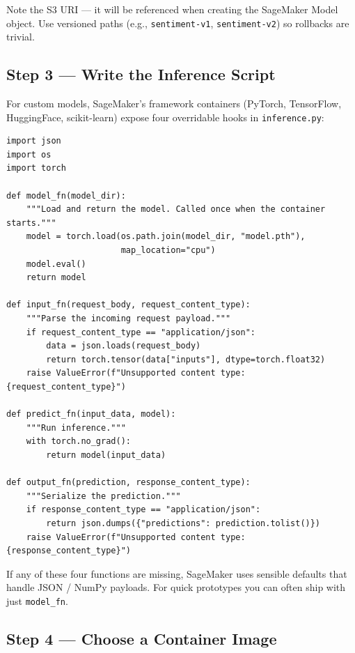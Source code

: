 \documentclass[11pt,a4paper]{article}
\begin{document}
Note the S3 URI --- it will be referenced when creating the SageMaker Model
object. Use versioned paths (e.g., \texttt{sentiment-v1}, \texttt{sentiment-v2})
so rollbacks are trivial.

\subsection{Step 3 --- Write the Inference Script}

For custom models, SageMaker's framework containers (PyTorch, TensorFlow,
HuggingFace, scikit-learn) expose four overridable hooks in \texttt{inference.py}:

\begin{lstlisting}[style=pycode]
import json
import os
import torch

def model_fn(model_dir):
    """Load and return the model. Called once when the container starts."""
    model = torch.load(os.path.join(model_dir, "model.pth"),
                       map_location="cpu")
    model.eval()
    return model

def input_fn(request_body, request_content_type):
    """Parse the incoming request payload."""
    if request_content_type == "application/json":
        data = json.loads(request_body)
        return torch.tensor(data["inputs"], dtype=torch.float32)
    raise ValueError(f"Unsupported content type: {request_content_type}")

def predict_fn(input_data, model):
    """Run inference."""
    with torch.no_grad():
        return model(input_data)

def output_fn(prediction, response_content_type):
    """Serialize the prediction."""
    if response_content_type == "application/json":
        return json.dumps({"predictions": prediction.tolist()})
    raise ValueError(f"Unsupported content type: {response_content_type}")
\end{lstlisting}

\begin{tipbox}
If any of these four functions are missing, SageMaker uses sensible defaults
that handle JSON / NumPy payloads. For quick prototypes you can often ship with
just \texttt{model\_fn}.
\end{tipbox}

\subsection{Step 4 --- Choose a Container Image}
\end{document}
